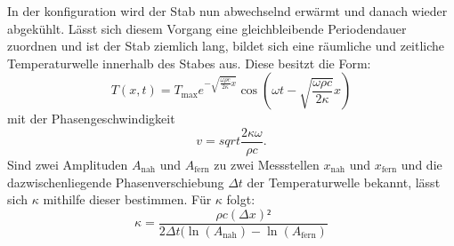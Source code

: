 In der konfiguration wird der Stab nun abwechselnd erwärmt und  danach wieder
abgekühlt. Lässt sich diesem Vorgang eine gleichbleibende Periodendauer zuordnen und
 ist der Stab ziemlich lang, bildet sich eine räumliche und zeitliche Temperaturwelle
  innerhalb des Stabes aus. Diese besitzt die Form:
  \begin{equation}
    T(x,t) = T_\text{max}e^{-\sqrt{{\frac{\omega \rho c}{2\kappa}}x}}\cos \left( \omega t - \sqrt{\frac{\omega \rho c}{2\kappa}}x \right)
  \end{equation}
mit der Phasengeschwindigkeit
\begin{equation}
  v = sqrt{\frac{2 \kappa \omega}{\rho c}}\text{.}
\end{equation}
Sind zwei Amplituden $A_\text{nah}$ und $A_\text{fern}$ zu zwei Messstellen
$x_\text{nah}$ und $x_\text{fern}$ und die dazwischenliegende Phasenverschiebung $\Delta t$
 der Temperaturwelle bekannt, lässt sich $\kappa$ mithilfe dieser bestimmen. Für $\kappa$ folgt:
 \begin{equation}
   \kappa = \frac{\rho c (\Delta x)²}{2 \Delta t (\ln(A_\text{nah})-\ln(A_\text{fern})}
 \end{equation}
